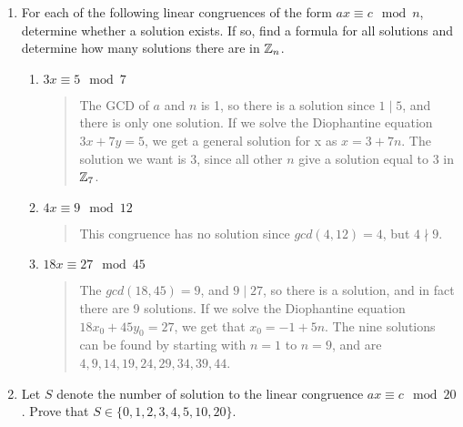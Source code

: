 \documentclass{hw}
\begin{document}

\begin{enumerate}
\item For each of the following linear congruences of the form $ax\equiv c\mod n$, determine whether a
solution exists. If so, find a formula for all solutions and determine how many solutions there are in
$\mathbb{Z}_{n}$.
\begin{enumerate}
\item $3x\equiv 5\mod7$
\begin{quote}
The GCD of $a$ and $n$ is 1, so there is a solution since $1\mid5$, and there is only one solution.
If we solve the Diophantine equation $3x+7y=5$, we get a general solution for x as $x=3+7n$. The solution
we want is 3, since all other $n$ give a solution equal to 3 in $\mathbb{Z}_{7}$.
\end{quote}
\item $4x\equiv 9\mod12$
\begin{quote}
This congruence has no solution since $gcd(4,12)=4$, but $4\nmid9$.
\end{quote}
\item $18x\equiv 27\mod45$
\begin{quote}
The $gcd(18,45)=9$, and $9\mid27$, so there is a solution, and in fact there are 9 solutions. If we
solve the Diophantine equation $18x_{0}+45y_{0}=27$, we get that $x_{0}=-1+5n$. The nine solutions can
be found by starting with $n=1$ to $n=9$, and are $4,9,14,19,24,29,34,39,44$.
\end{quote}
\end{enumerate}

\item Let $S$ denote the number of solution to the linear congruence $ax\equiv c\mod20$. Prove that
$S\in\{ 0,1,2,3,4,5,10,20\}$.
\end{enumerate}
\end{document}
